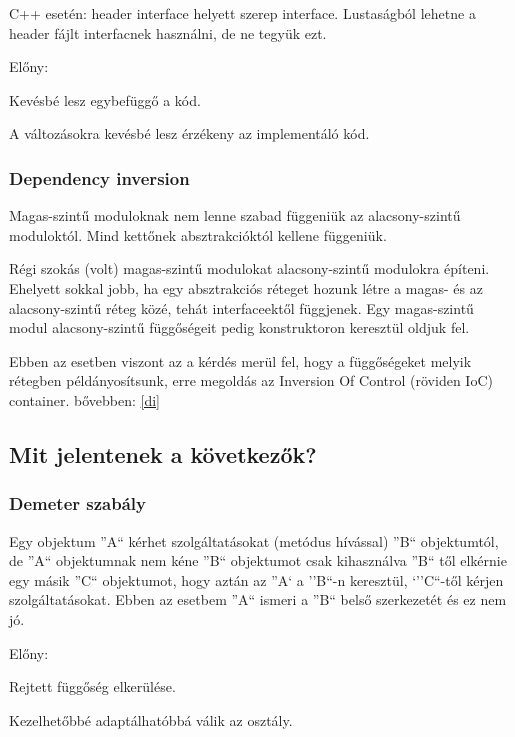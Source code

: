 \documentclass[a4paper,14pt]{extarticle}
\begin{document}
			C++ esetén: header interface helyett szerep interface. Lustaságból lehetne a header fájlt interfacnek használni, de ne tegyük ezt.
			\par Előny:
			\begin{compactitem}
				\item Kevésbé lesz egybefüggő a kód.
				\item A változásokra kevésbé lesz érzékeny az implementáló kód.
			\end{compactitem}
		
			\subsubsection{{\Large  D}ependency inversion}
			Magas-szintű moduloknak nem lenne szabad függeniük az alacsony-szintű moduloktól.
			Mind kettőnek absztrakcióktól kellene függeniük.
			
			Régi szokás (volt) magas-szintű modulokat alacsony-szintű modulokra építeni.
			Ehelyett sokkal jobb, ha egy absztrakciós réteget hozunk létre a magas- és az alacsony-szintű réteg közé, tehát interfaceektől függjenek. Egy magas-szintű modul alacsony-szintű függőségeit pedig konstruktoron keresztül oldjuk fel.

			Ebben az esetben viszont az a kérdés merül fel, hogy a függőségeket melyik rétegben példányosítsunk, erre megoldás az Inversion Of Control (röviden IoC) container. bővebben: \ref{di}
			
		\subsection{Mit jelentenek a következők?}
			\subsubsection{Demeter szabály}
			Egy objektum ''A`` kérhet szolgáltatásokat (metódus hívással) ''B`` objektumtól, de ''A`` objektumnak nem kéne ''B`` objektumot csak kihasználva ''B`` től elkérnie egy másik ''C`` objektumot, hogy aztán az ''A` a ''B``-n keresztül, `''C``-től kérjen szolgáltatásokat. Ebben az esetbem ''A`` ismeri a ''B`` belső szerkezetét és ez nem jó.
			\par Előny:
			\begin{compactitem}
				\item Rejtett függőség elkerülése.
				\item Kezelhetőbbé adaptálhatóbbá válik az osztály.
			\end{compactitem}
		
\end{document}
